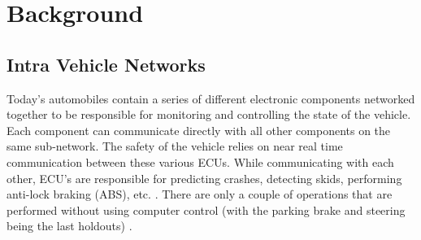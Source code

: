 
\chapter{Background}
\label{chap:background}


\section{Intra Vehicle Networks}
\label{sec:vni}
Today's automobiles contain a series of different electronic components networked together to be responsible for monitoring and controlling the state of the vehicle. Each component can communicate directly with all other components on the same sub-network. The safety of the vehicle relies on near real time communication between these various ECUs. While communicating with each other, ECU's are responsible for predicting crashes, detecting skids, performing anti-lock braking (ABS), etc. \cite{Yadav16}. There are only a couple of operations that are performed without using computer control (with the parking brake and steering being the last holdouts) \cite{Kosher}. 

